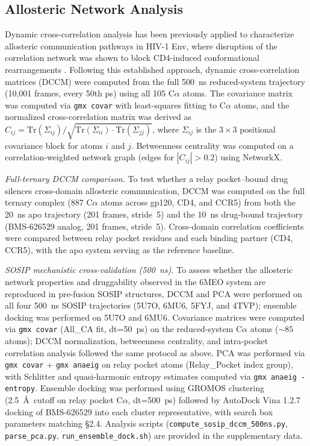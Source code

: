 \documentclass[11pt,a4paper]{article}
\begin{document}
\subsection{Allosteric Network Analysis}

Dynamic cross-correlation analysis has been previously applied to characterize allosteric communication pathways in HIV-1 Env, where disruption of the correlation network was shown to block CD4-induced conformational rearrangements \citep{Henderson2020}. Following this established approach, dynamic cross-correlation matrices (DCCM) were computed from the full 500~ns reduced-system trajectory (10,001 frames, every 50th ps) using all 105 C$\alpha$ atoms. The covariance matrix was computed via \texttt{gmx covar} with least-squares fitting to C$\alpha$ atoms, and the normalized cross-correlation matrix was derived as $C_{ij} = \mathrm{Tr}(\Sigma_{ij}) / \sqrt{\mathrm{Tr}(\Sigma_{ii}) \cdot \mathrm{Tr}(\Sigma_{jj})}$, where $\Sigma_{ij}$ is the $3 \times 3$ positional covariance block for atoms $i$ and $j$. Betweenness centrality was computed on a correlation-weighted network graph (edges for $|C_{ij}| > 0.2$) using NetworkX.

\textit{Full-ternary DCCM comparison.} To test whether a relay pocket--bound drug silences cross-domain allosteric communication, DCCM was computed on the full ternary complex (887 C$\alpha$ atoms across gp120, CD4, and CCR5) from both the 20~ns apo trajectory (201 frames, stride~5) and the 10~ns drug-bound trajectory (BMS-626529 analog, 201 frames, stride~5). Cross-domain correlation coefficients were compared between relay pocket residues and each binding partner (CD4, CCR5), with the apo system serving as the reference baseline.

\textit{SOSIP mechanistic cross-validation (500~ns).} To assess whether the allosteric network properties and druggability observed in the 6MEO system are reproduced in pre-fusion SOSIP structures, DCCM and PCA were performed on all four 500~ns SOSIP trajectories (5U7O, 6MU6, 5FYJ, and 4TVP); ensemble docking was performed on 5U7O and 6MU6. Covariance matrices were computed via \texttt{gmx covar} (All\_CA fit, dt=50~ps) on the reduced-system C$\alpha$ atoms (${\sim}85$ atoms); DCCM normalization, betweenness centrality, and intra-pocket correlation analysis followed the same protocol as above. PCA was performed via \texttt{gmx covar} + \texttt{gmx anaeig} on relay pocket atoms (Relay\_Pocket index group), with Schlitter and quasi-harmonic entropy estimates computed via \texttt{gmx anaeig -entropy}. Ensemble docking was performed using GROMOS clustering (2.5~\AA\ cutoff on relay pocket C$\alpha$, dt=500~ps) followed by AutoDock Vina 1.2.7 docking of BMS-626529 into each cluster representative, with search box parameters matching \S2.4. Analysis scripts (\texttt{compute\_sosip\_dccm\_500ns.py}, \texttt{parse\_pca.py}, \texttt{run\_ensemble\_dock.sh}) are provided in the supplementary data.
\end{document}
